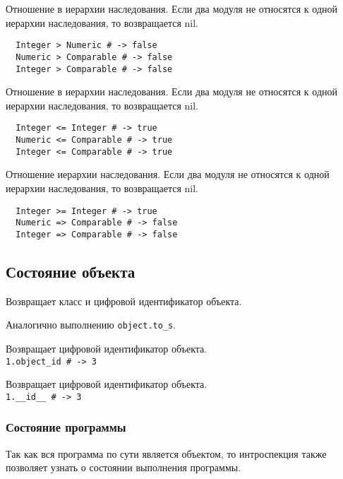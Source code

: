 \begin{methodlist}
  Отношение в иерархии наследования. Если два модуля не относятся к одной иерархии наследования, то возвращается nil.
  \begin{verbatim}
  Integer > Numeric # -> false
  Numeric > Comparable # -> false
  Integer > Comparable # -> false
  \end{verbatim}

  Отношение в иерархии наследования. Если два модуля не относятся к одной иерархии наследования, то возвращается nil.
  \begin{verbatim}
  Integer <= Integer # -> true 
  Numeric <= Comparable # -> true
  Integer <= Comparable # -> true
  \end{verbatim}

  Отношение иерархии наследования. Если два модуля не относятся к одной иерархии наследования, то возвращается nil.
  \begin{verbatim}
  Integer >= Integer # -> true 
  Numeric => Comparable # -> false
  Integer => Comparable # -> false
  \end{verbatim}
\end{methodlist}

\subsection{Состояние объекта}

\begin{methodlist}
  Возвращает класс и цифровой идентификатор объекта.

  Аналогично выполнению \verb!object.to_s!. 

  Возвращает цифровой идентификатор объекта. 
  \\\verb!1.object_id # -> 3!
 
  Возвращает цифровой идентификатор объекта.
  \\\verb!1.__id__ # -> 3!
\end{methodlist}

\subsubsection*{Состояние программы}

Так как вся программа по сути является объектом, то интроспекция также позволяет узнать о состоянии выполнения программы.

